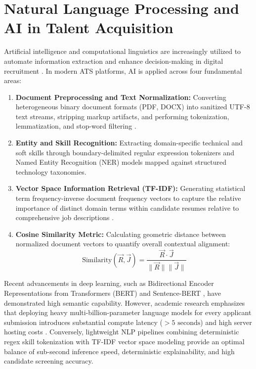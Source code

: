 \section{Natural Language Processing and AI in Talent Acquisition}
Artificial intelligence and computational linguistics are increasingly utilized to automate information extraction and enhance decision-making in digital recruitment \cite{roy2020resume, chen2018resume}. In modern ATS platforms, AI is applied across four fundamental areas:
\begin{enumerate}
    \item \textbf{Document Preprocessing and Text Normalization:} Converting heterogeneous binary document formats (PDF, DOCX) into sanitized UTF-8 text streams, stripping markup artifacts, and performing tokenization, lemmatization, and stop-word filtering \cite{manning2008information}.
    \item \textbf{Entity and Skill Recognition:} Extracting domain-specific technical and soft skills through boundary-delimited regular expression tokenizers and Named Entity Recognition (NER) models mapped against structured technology taxonomies.
    \item \textbf{Vector Space Information Retrieval (TF-IDF):} Generating statistical term frequency-inverse document frequency vectors to capture the relative importance of distinct domain terms within candidate resumes relative to comprehensive job descriptions \cite{salton1988term}.
    \item \textbf{Cosine Similarity Metric:} Calculating geometric distance between normalized document vectors to quantify overall contextual alignment:
    \begin{equation}
        \text{Similarity}(\vec{R}, \vec{J}) = \frac{\vec{R} \cdot \vec{J}}{\|\vec{R}\| \|\vec{J}\|}
    \end{equation}
\end{enumerate}

Recent advancements in deep learning, such as Bidirectional Encoder Representations from Transformers (BERT) \cite{devlin2018bert} and Sentence-BERT \cite{reimers2019sentence}, have demonstrated high semantic capability. However, academic research emphasizes that deploying heavy multi-billion-parameter language models for every applicant submission introduces substantial compute latency ($>5\text{ seconds}$) and high server hosting costs \cite{kuhail2022recruitment}. Conversely, lightweight NLP pipelines combining deterministic regex skill tokenization with TF-IDF vector space modeling provide an optimal balance of sub-second inference speed, deterministic explainability, and high candidate screening accuracy.

